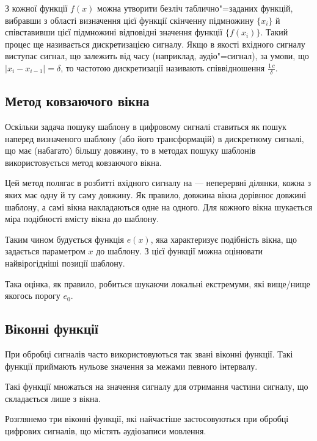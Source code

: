     З кожної функції $f(x)$ можна утворити безліч таблично"=заданих функцій, вибравши з області визначення цієї
    функції скінченну підмножину $\{x_i\}$ й співставивши цієї підмножині відповідні значення функції $\{f(x_i)\}$.
    Такий процес ще називається дискретизацією сигналу.
    Якщо в якості вхідного сигналу виступає сигнал, що залежить від часу (наприклад, аудіо"=сигнал), за умови, що $|
    x_i - x_{i-1}| = \delta$, то частотою дискретизації називають співвідношення $\frac{1\,c}{\delta}$.

    \subsection{Метод ковзаючого вікна}
    \label{ss:sliding-window}
        Оскільки задача пошуку шаблону в цифровому сигналі ставиться як пошук наперед визначеного шаблону (або його
        трансформацій) в дискретному сигналі, що має (набагато) більшу довжину, то в методах пошуку шаблонів
        використовується метод ковзаючого вікна.

        Цей метод полягає в розбитті вхідного сигналу на  --- неперервні ділянки, кожна з яких має
        одну й ту саму довжину.
        Як правило, довжина вікна дорівнює довжині шаблону, а самі вікна накладаються одне на одного.
        Для кожного вікна шукається міра подібності вмісту вікна до шаблону.

        Таким чином будується функція $e(x)$, яка характеризує подібність вікна, що задається параметром $x$ до
        шаблону.
        З цієї функції можна оцінювати найвірогідніші позиції шаблону.

        Така оцінка, як правило, робиться шукаючи локальні екстремуми, які вище/нище якогось порогу $e_{0}$.

    \subsection{Віконні функції}
        При обробці сигналів часто використовуються так звані віконні функції.
        Такі функції приймають нульове значення за межами певного інтервалу.

        Такі функції множаться на значення сигналу для отримання частини сигналу, що складається лише з вікна.

        Розглянемо три віконні функції, які найчастіше застосовуються при обробці цифрових сигналів, що містять
        аудіозаписи мовлення.

